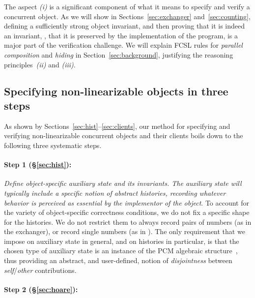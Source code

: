 The aspect \emph{(i)} is a significant component of what it means to
specify and verify a concurrent object. As we will show in
Sections~\ref{sec:exchanger} and~\ref{sec:counting}, defining a
sufficiently strong object invariant, and then proving that it is
indeed an invariant, \ie, that it is preserved by the implementation
of the program, is a major part of the verification challenge.
%
We will explain FCSL rules for \emph{parallel composition} and
\emph{hiding} in Section~\ref{sec:background}, justifying the
reasoning principles~\emph{(ii)} and \emph{(iii)}.

\subsection{Specifying non-linearizable objects in three steps}
\label{sec:three-steps-reas}

As shown by Sections~\ref{sec:hist}--\ref{sec:clients}, our method for
specifying and verifying non-linearizable concurrent objects and their
clients boils down to the following three systematic steps.

\paragraph{Step 1 (\S\ref{sec:hist}):} 

\emph{Define object-specific auxiliary state and its invariants. The
  auxiliary state will typically include a specific notion of abstract
  histories, recording whatever behavior is perceived as essential by
  the implementor of the object}.
%
%
To account for the variety of object-specific correctness conditions,
we do not fix a specific shape for the histories. We do not restrict
them to always record pairs of numbers (as in the exchanger), or
record single numbers (as in ). The only requirement that
we impose on auxiliary state in general, and on histories in
particular, is that the chosen type of auxiliary state is an instance
of the PCM algebraic structure~\cite{Sergey-al:ESOP15}, thus providing
an abstract, and user-defined, notion of \emph{disjointness} between
\emph{self}/\emph{other} contributions.

\paragraph{Step 2 (\S\ref{sec:hoare}):} 

